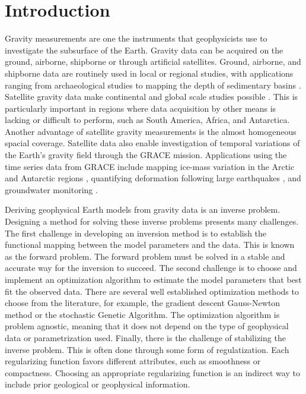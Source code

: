 \chapter{Introduction}


Gravity measurements are one the instruments that geophysicists use to
investigate the subsurface of the Earth.
Gravity data can be acquired on the ground, airborne, shipborne or through
artificial satellites.
Ground, airborne, and shipborne data are routinely used in local or regional
studies, with applications ranging from archaeological studies
\citep[e.g., ][]{panisova2013} to mapping the depth of
sedimentary basins \citep[e.g., ][]{gordon2013}.
Satellite gravity data make continental and global scale studies possible
\citep[e.g., ][]{vandermeijde2013, vandermeijde2015, bouman2013,
braitenberg2015, reguzzoni2013}.
This is particularly important in regions where data acquisition by other means
is lacking or difficult to perform, such as South America, Africa, and
Antarctica.
Another advantage of satellite gravity measurements is the almost homogeneous
spacial coverage.
Satellite data also enable investigation of temporal variations of the Earth's
gravity field through the GRACE mission.
Applications using the time series data from GRACE include mapping ice-mass
variation in the Arctic \citep{chen2011} and Antarctic regions
\citep{ramillien2006}, quantifying deformation following large earthquakes
\citep{mikhailov2014}, and groundwater monitoring \citep{humphrey2016}.

Deriving geophysical Earth models from gravity data is an inverse problem.
Designing a method for solving these inverse problems presents many challenges.
The first challenge in developing an inversion method is to establish the
functional mapping between the model parameters and the data.
This is known as the forward problem.
The forward problem must be solved in a stable and accurate way for the
inversion to succeed.
The second challenge is to choose and implement an optimization algorithm to
estimate the model parameters that best fit the observed data.
There are several well established optimization methods to choose from the
literature, for example, the gradient descent Gauss-Newton method or the
stochastic Genetic Algorithm.
The optimization algorithm is problem agnostic, meaning that it does not depend
on the type of geophysical data or parametrization used.
Finally, there is the challenge of stabilizing the inverse problem.
This is often done through some form of regulatization.
Each regularizing function favors different attributes, such as smoothness or
compactness.
Choosing an appropriate regularizing function is an indirect way to include
prior geological or geophysical information.

